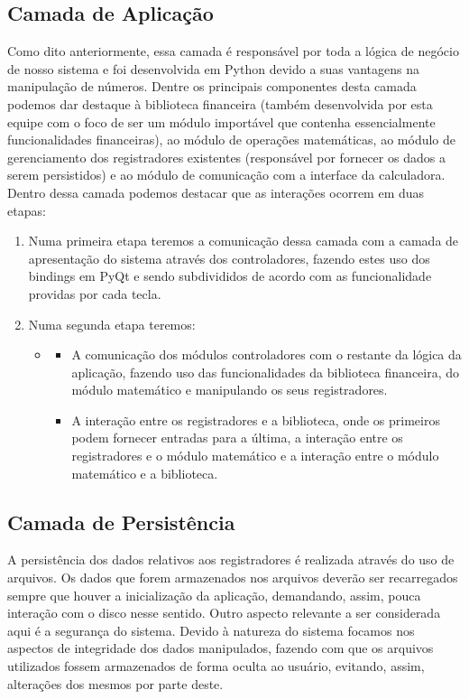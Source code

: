 \subsection{Camada de Aplicação}
Como dito anteriormente, essa camada é responsável por toda a lógica de negócio de nosso sistema e foi desenvolvida em Python devido a suas vantagens na manipulação de números.
Dentre os principais componentes desta camada podemos dar destaque à biblioteca financeira (também desenvolvida por esta equipe com o foco de ser um módulo importável que contenha essencialmente funcionalidades financeiras), ao módulo de operações matemáticas, ao módulo de gerenciamento dos registradores existentes (responsável por fornecer os dados a serem persistidos) e ao módulo de comunicação com a interface da calculadora.
 Dentro dessa camada podemos destacar que as interações ocorrem em duas etapas:
\begin{enumerate}
 \item Numa primeira etapa teremos a comunicação dessa camada com a camada de apresentação do sistema através dos controladores, fazendo estes uso dos bindings em PyQt e sendo subdivididos de acordo com as funcionalidade providas por cada tecla.
 \item Numa segunda etapa teremos:	
 \begin{itemize}
  \item \begin{itemize}
         \item A comunicação dos módulos controladores com o restante da lógica da aplicação, fazendo uso das funcionalidades da biblioteca financeira, do módulo matemático e manipulando os seus registradores.
	 \item A interação entre os registradores e a biblioteca, onde os primeiros podem fornecer entradas para a última, a interação entre os registradores e o módulo matemático e a interação entre o módulo matemático e a biblioteca.
        \end{itemize}
 \end{itemize}
\end{enumerate}

\subsection{Camada de Persistência}
A persistência dos dados relativos aos registradores é realizada através do uso de arquivos. Os dados que forem armazenados nos arquivos deverão ser recarregados sempre que houver a inicialização da aplicação, demandando, assim, pouca interação com o disco nesse sentido.
Outro aspecto relevante a ser considerada aqui é a segurança do sistema.  Devido à natureza do sistema focamos nos aspectos de integridade dos dados manipulados, fazendo com que os arquivos utilizados fossem armazenados de forma oculta ao usuário, evitando, assim, alterações dos mesmos por parte deste.

